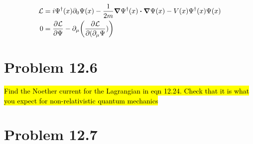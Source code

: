 \documentclass{article}
\begin{document}
\begin{align*}
    \mathcal{L} & =i\Psi^\dagger(x)\partial_0\Psi(x)-\frac{1}{2m}\grad\Psi^\dagger(x)\vdot\grad\Psi(x)-V(x)\Psi^\dagger(x)\Psi(x) \\
    0           & =\pdv{\mathcal{L}}{\Psi}-\partial_\mu\pqty{\pdv{\mathcal{L}}{(\partial_\mu \Psi})}
\end{align*}

\section*{Problem 12.6}
\begin{quoting}
    \hl{Find the Noether current for the Lagrangian in eqn 12.24. Check that it is what you expect for non-relativistic quantum mechanics}
\end{quoting}


\section*{Problem 12.7}
\end{document}

